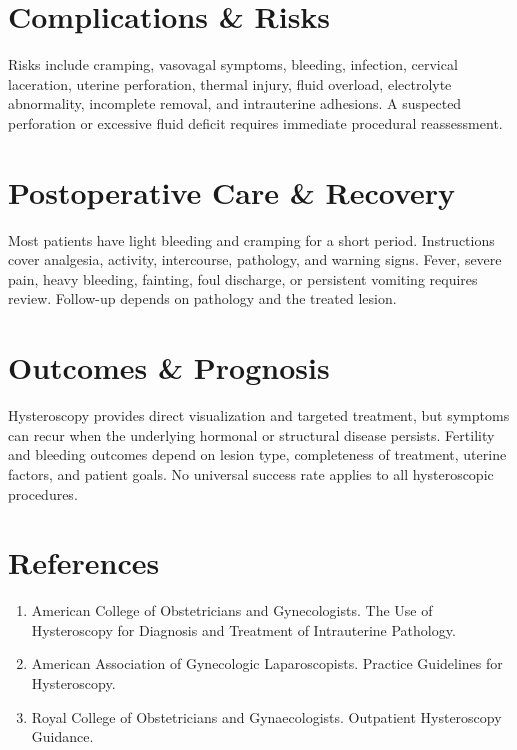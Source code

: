 \section*{Complications \& Risks}
Risks include cramping, vasovagal symptoms, bleeding, infection, cervical laceration, uterine perforation, thermal injury, fluid overload, electrolyte abnormality, incomplete removal, and intrauterine adhesions. A suspected perforation or excessive fluid deficit requires immediate procedural reassessment.

\section*{Postoperative Care \& Recovery}
Most patients have light bleeding and cramping for a short period. Instructions cover analgesia, activity, intercourse, pathology, and warning signs. Fever, severe pain, heavy bleeding, fainting, foul discharge, or persistent vomiting requires review. Follow-up depends on pathology and the treated lesion.

\section*{Outcomes \& Prognosis}
Hysteroscopy provides direct visualization and targeted treatment, but symptoms can recur when the underlying hormonal or structural disease persists. Fertility and bleeding outcomes depend on lesion type, completeness of treatment, uterine factors, and patient goals. No universal success rate applies to all hysteroscopic procedures.

\section*{References}
\begin{enumerate}
  \item American College of Obstetricians and Gynecologists. The Use of Hysteroscopy for Diagnosis and Treatment of Intrauterine Pathology.
  \item American Association of Gynecologic Laparoscopists. Practice Guidelines for Hysteroscopy.
  \item Royal College of Obstetricians and Gynaecologists. Outpatient Hysteroscopy Guidance.
\end{enumerate}

\clearpage
